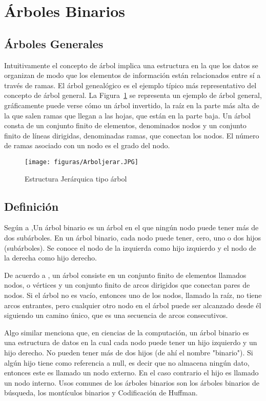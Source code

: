 \documentclass[10pt,conference]{IEEEtran}
\begin{document}
\section{\textbf{Árboles Binarios}} 
\subsection{\textbf{Árboles Generales}}
Intuitivamente el concepto de árbol implica una estructura en la que los datos se organizan de modo que los elementos de información están relacionados entre sí a través de ramas. El árbol genealógico es el ejemplo típico más representativo del concepto de árbol general. La Figura~\ref{festruc} se representa un ejemplo de árbol general, gráficamente puede verse cómo un árbol invertido, la raíz en la parte más alta de la que salen ramas que llegan a las hojas, que están en la parte baja.
Un árbol consta de un conjunto finito de elementos, denominados nodos y un conjunto finito de líneas dirigidas, denominadas ramas, que conectan los nodos. El número de ramas asociado con un nodo es el grado del nodo.
\begin{figure}[H]
\begin{center}
       \texttt{[image: figuras/Arboljerar.JPG]}
      \caption{Estructura Jerárquica tipo árbol}
      \label{festruc} 
      \end{center}
\end{figure}
\subsection{\textbf{Definición}}

Según a \citep{joyanes},Un árbol binario es un árbol en el que ningún nodo puede tener más de dos subárboles. En un árbol binario, cada nodo puede tener, cero, uno o dos hijos (subárboles). Se conoce el nodo
de la izquierda como hijo izquierdo y el nodo de la derecha como hijo derecho.

\par De acuerdo a \citep{ny}, un árbol consiste en un conjunto finito de elementos llamados nodos, o vértices y un conjunto finito de arcos dirigidos que conectan pares de nodos. Si el árbol no es vacío, entonces uno de los nodos, llamado la raíz, no tiene arcos entrantes, pero cualquier otro nodo en el árbol puede ser alcanzado desde él siguiendo un camino único, que es una secuencia de arcos consecutivos.

\par Algo similar menciona \citep{wiki} que, en ciencias de la computación, un árbol binario es una estructura de datos en la cual cada nodo puede tener un hijo izquierdo y un hijo derecho. No pueden tener más de dos hijos (de ahí el nombre "binario"). Si algún hijo tiene como referencia a null, es decir que no almacena ningún dato, entonces este es llamado un nodo externo. En el caso contrario el hijo es llamado un nodo interno. Usos comunes de los árboles binarios son los árboles binarios de búsqueda, los montículos binarios y Codificación de Huffman.
\end{document}
